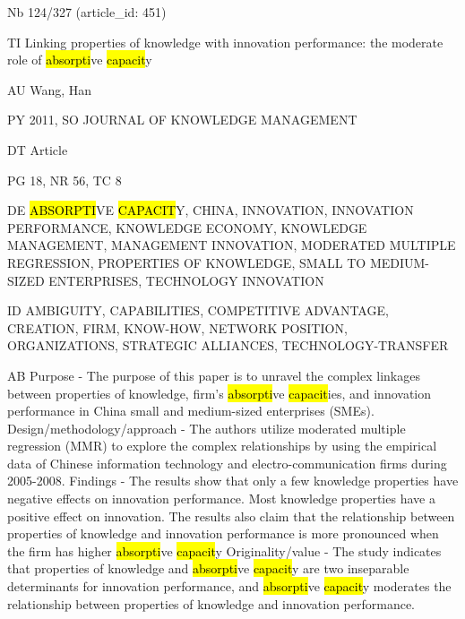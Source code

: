 \documentclass[a4paper]{article}
\begin{document}
\vspace*{-2cm}
Nb \tabto{0cm}124/327 (article\_id: 451)\par
TI \tabto{0cm}Linking properties of knowledge with innovation performance: the moderate role of \hl{absorpti}ve \hl{capacit}y\par
AU \tabto{0cm}Wang, Han\par
PY \tabto{0cm}2011, SO JOURNAL OF KNOWLEDGE MANAGEMENT\par
DT \tabto{0cm}Article\par
PG \tabto{0cm}18, NR 56, TC 8\par
DE \tabto{0cm}\hl{ABSORPTI}VE \hl{CAPACIT}Y, CHINA, INNOVATION, INNOVATION PERFORMANCE, KNOWLEDGE ECONOMY, KNOWLEDGE MANAGEMENT, MANAGEMENT INNOVATION, MODERATED MULTIPLE REGRESSION, PROPERTIES OF KNOWLEDGE, SMALL TO MEDIUM-SIZED ENTERPRISES, TECHNOLOGY INNOVATION\par
ID \tabto{0cm}AMBIGUITY, CAPABILITIES, COMPETITIVE ADVANTAGE, CREATION, FIRM, KNOW-HOW, NETWORK POSITION, ORGANIZATIONS, STRATEGIC ALLIANCES, TECHNOLOGY-TRANSFER\par
AB \tabto{0cm}Purpose - The purpose of this paper is to unravel the complex linkages between properties of knowledge, firm's \hl{absorpti}ve \hl{capacit}ies, and innovation performance in China small and medium-sized enterprises (SMEs).
Design/methodology/approach - The authors utilize moderated multiple regression (MMR) to explore the complex relationships by using the empirical data of Chinese information technology and electro-communication firms during 2005-2008.
Findings - The results show that only a few knowledge properties have negative effects on innovation performance. Most knowledge properties have a positive effect on innovation. The results also claim that the relationship between properties of knowledge and innovation performance is more pronounced when the firm has higher \hl{absorpti}ve \hl{capacit}y
Originality/value - The study indicates that properties of knowledge and \hl{absorpti}ve \hl{capacit}y are two inseparable determinants for innovation performance, and \hl{absorpti}ve \hl{capacit}y moderates the relationship between properties of knowledge and innovation performance.\par
\clearpage
\end{document}
